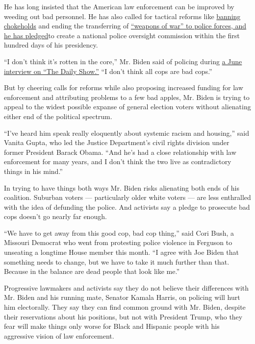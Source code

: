 He has long insisted that the American law enforcement can be improved
by weeding out bad personnel. He has also called for tactical reforms
like \href{https://go.joebiden.com/page/s/ban-chokeholds-now}{banning
chokeholds} and ending the transferring of
\href{https://www.newsweek.com/bidens-proposals-police-reform-include-banning-chokeholds-weapons-war-cops-1508158}{``weapons
of war'' to police forces, and he has pledged}to create a national
police oversight commission within the first hundred days of his
presidency.

``I don't think it's rotten in the core,'' Mr. Biden said of policing
during \href{https://www.youtube.com/watch?v=tmUL1IYbH0U}{a June
interview on ``The Daily Show.''} ``I don't think all cops are bad
cops.''

But by cheering calls for reforms while also proposing increased funding
for law enforcement and attributing problems to a few bad apples, Mr.
Biden is trying to appeal to the widest possible expanse of general
election voters without alienating either end of the political spectrum.

``I've heard him speak really eloquently about systemic racism and
housing,'' said Vanita Gupta, who led the Justice Department's civil
rights division under former President Barack Obama. ``And he's had a
close relationship with law enforcement for many years, and I don't
think the two live as contradictory things in his mind.''

In trying to have things both ways Mr. Biden risks alienating both ends
of his coalition. Suburban voters --- particularly older white voters
--- are less enthralled with the idea of defunding the police. And
activists say a pledge to prosecute bad cops doesn't go nearly far
enough.

``We have to get away from this good cop, bad cop thing,'' said Cori
Bush, a Missouri Democrat who went from protesting police violence in
Ferguson to unseating a longtime House member this month. ``I agree with
Joe Biden that something needs to change, but we have to take it much
further than that. Because in the balance are dead people that look like
me.''

Progressive lawmakers and activists say they do not believe their
differences with Mr. Biden and his running mate, Senator Kamala Harris,
on policing will hurt him electorally. They say they can find common
ground with Mr. Biden, despite their reservations about his positions,
but not with President Trump, who they fear will make things only worse
for Black and Hispanic people with his aggressive vision of law
enforcement.

